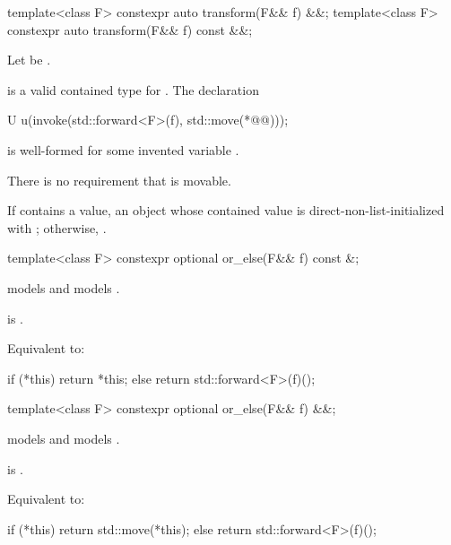 \begin{itemdecl}
template<class F> constexpr auto transform(F&& f) &&;
template<class F> constexpr auto transform(F&& f) const &&;
\end{itemdecl}

\begin{itemdescr}
\pnum
Let  be
.

\pnum
\mandates
{} is a valid contained type for .
The declaration
\begin{codeblock}
U u(invoke(std::forward<F>(f), std::move(*@@)));
\end{codeblock}
is well-formed for some invented variable .
\begin{note}
There is no requirement that  is movable.
\end{note}

\pnum
\returns
If  contains a value, an  object
whose contained value is direct-non-list-initialized with
;
otherwise, .
\end{itemdescr}

\begin{itemdecl}
template<class F> constexpr optional or_else(F&& f) const &;
\end{itemdecl}

\begin{itemdescr}
\pnum
\constraints
{} models  and
 models .

\pnum
\mandates
{} is .

\pnum
\effects
Equivalent to:
\begin{codeblock}
if (*this) {
  return *this;
} else {
  return std::forward<F>(f)();
}
\end{codeblock}
\end{itemdescr}

\begin{itemdecl}
template<class F> constexpr optional or_else(F&& f) &&;
\end{itemdecl}

\begin{itemdescr}
\pnum
\constraints
{} models  and
 models .

\pnum
\mandates
{} is .

\pnum
\effects
Equivalent to:
\begin{codeblock}
if (*this) {
  return std::move(*this);
} else {
  return std::forward<F>(f)();
}
\end{codeblock}
\end{itemdescr}

